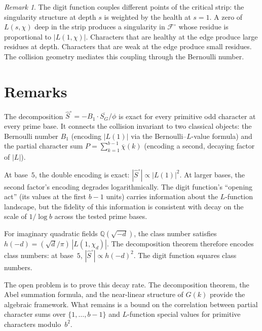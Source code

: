 \documentclass[12pt]{amsart}
\theoremstyle{definition}
\theoremstyle{remark}
\newtheorem{remark}[theorem]{Remark}
\begin{document}
\begin{remark}
The digit function couples different points of the
critical strip: the singularity structure at depth
$s$ is weighted by the health at $s = 1$. A zero of
$L(s, \chi)$ deep in the strip produces a
singularity in $\mathcal{F}^{\circ}$ whose residue
is proportional to $|L(1, \chi)|$. Characters that
are healthy at the edge produce large residues at
depth. Characters that are weak at the edge produce
small residues. The collision geometry mediates this
coupling through the Bernoulli number.
\end{remark}

\section{Remarks}

The decomposition
$\hat{S}^{\circ} = -B_1 \cdot \overline{S_G} / \phi$
is exact for every primitive odd character at every
prime base. It connects the collision invariant to
two classical objects: the Bernoulli number $B_1$
(encoding $|L(1)|$ via the Bernoulli--$L$-value formula) and
the partial character sum $P = \sum_{k=1}^{b-1}
\overline{\chi}(k)$ (encoding a second, decaying
factor of $|L|$).

At base~$5$, the double encoding is exact:
$|\hat{S}^{\circ}| \propto |L(1)|^2$. At larger
bases, the second factor's encoding degrades
logarithmically. The digit function's ``opening
act'' (its values at the first $b{-}1$ units) carries
information about the $L$-function landscape, but the
fidelity of this information is consistent with
decay on the scale of $1/\log b$ across the tested
prime bases.

For imaginary quadratic fields $\mathbb{Q}(\sqrt{-d})$,
the class number satisfies
$h(-d) = (\sqrt{d}/\pi)\, |L(1, \chi_d)|$.
The decomposition theorem therefore encodes class
numbers: at base~$5$,
$|\hat{S}^{\circ}| \propto h(-d)^2$. The digit
function squares class numbers.

The open problem is to prove this decay rate. The
decomposition theorem, the Abel summation formula,
and the near-linear structure of $G(k)$ provide the
algebraic framework. What remains is a bound on the
correlation between partial character sums over
$\{1, \ldots, b{-}1\}$ and $L$-function special
values for primitive characters modulo~$b^2$.
\end{document}
